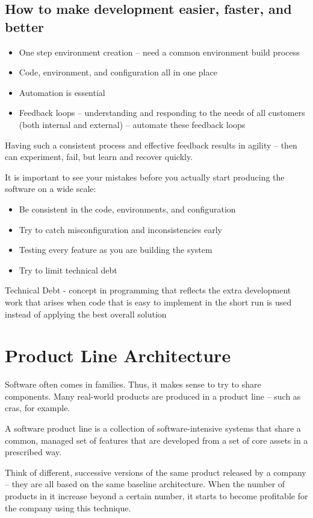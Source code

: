 \documentclass[a4paper]{article}
\begin{document}
\subsection{How to make development easier, faster, and better}
\begin{itemize}
\item One step environment creation – need a common environment build process
\item Code, environment, and configuration all in one place
\item Automation is essential
\item Feedback loops – understanding and responding to the needs of all customers (both internal and external) – automate these feedback loops
\end{itemize}
Having such a consistent process and effective feedback results in agility – then can experiment, fail, but learn and recover quickly.

It is important to see your mistakes before you actually start producing the software on a wide scale: 
\begin{itemize}
\item Be consistent in the code, environments, and configuration
\item Try to catch misconfiguration and inconsistencies early
\item Testing every feature as you are building the system
\item Try to limit technical debt 
\end{itemize}
Technical Debt - concept in programming that reflects the extra development work that arises when code that is easy to implement in the short run is used instead of applying the best overall solution

\newpage
\section{Product Line Architecture}
Software often comes in families. Thus, it makes sense to try to share components. Many real-world products are produced in a product line – such as cras, for example.

A software product line is a collection of software-intensive systems that share a common, managed set of features that are developed from a set of core assets in a prescribed way. 

Think of different, successive versions of the same product released by a company – they are all based on the same baseline architecture. When the number of products in it increase beyond a certain number, it starts to become profitable for the company using this technique.
\end{document}
